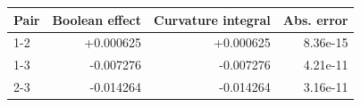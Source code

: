 \begin{tabular}{lrrr}
\toprule
Pair & Boolean effect & Curvature integral & Abs. error \\
\midrule
1-2 & +0.000625 & +0.000625 & 8.36e-15 \\
1-3 & -0.007276 & -0.007276 & 4.21e-11 \\
2-3 & -0.014264 & -0.014264 & 3.16e-11 \\
\bottomrule
\end{tabular}
